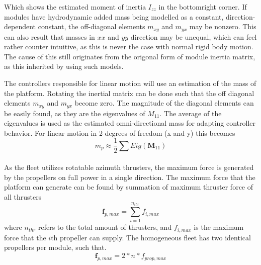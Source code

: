 Which shows the estimated moment of inertia $I_{zz}$ in the bottomright corner. If modules have hydrodynamic added mass being modelled as a constant, direction-dependent constant, the off-diagonal elements $m_{xy}$ and $m_{yx}$ may be nonzero. This can also result that masses in $xx$ and $ yy$ direction may be unequal, which can feel rather counter intuitive, as this is never the case with normal rigid body motion. The cause of this still originates from the origonal form of module inertia matrix, as this inherited by using such models. 

The controllers responsible for linear motion will use an estimation of the mass of the platform. Rotating the inertial matrix can be done such that the off diagonal elements $m_{xy}$ and $m_{yx}$ become zero. The magnitude of the diagonal elements can be easily found, as they are the eigenvalues of $M_{11}$. The average of the eigenvalues is used as the estimated omni-directional mass for adapting controller behavior. For linear motion in 2 degrees of freedom (x and y) this becomes
\begin{equation}
	m_{p} \approx \frac{1}{2} \sum_{}^{}  Eig ( \textbf{M}_{11} )
\end{equation}

As the fleet utilizes rotatable azimuth thrusters, the maximum force is generated by the propellers on full power in a single direction. The maximum force that the platform can generate can be found by summation of maximum thruster force of all thrusters
\begin{equation}
\textbf{f}_{p,max} = \sum_{i=1}^{n_{thr}} f_{i,max}
\end{equation}
where $n_{thr}$ refers to the total amount of thrusters, and $f_{i,max}$ is the maximum force that the $i$th propeller can supply. The homogeneous fleet has two identical propellers per module, such that. 
\begin{equation}
\textbf{f}_{p,max} = 2*n* f_{prop,max}
\label{Maxforce1}
\end{equation}


